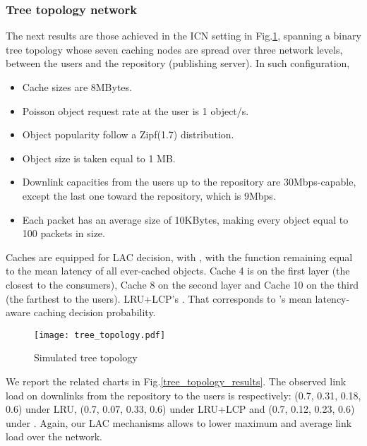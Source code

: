 \documentclass[conference]{IEEEtran}
\begin{document}
\subsubsection{Tree topology network}
The next results are those achieved in the ICN setting in Fig.\ref{fig:tree_topology}, spanning a binary tree topology whose
seven caching nodes are spread over three network levels, between the users and
the repository (publishing server). In such configuration, 
\begin{itemize}
	\item Cache sizes are 8MBytes.
	\item Poisson object request rate at the user is 1 object/s.
	\item Object popularity follow a Zipf(1.7) distribution.
	\item Object size is taken equal to 1 MB.
	\item Downlink capacities from the users up to the repository are 
	30Mbps-capable, except the last one toward the repository, which is 9Mbps.
	\item Each packet has an average size of 10KBytes, making every object equal to 100 packets in size.
\end{itemize}

Caches are equipped for LAC decision, with , with  the function  remaining equal to the mean latency of all ever-cached objects.
Cache 4 is on the first layer (the closest to the consumers), Cache 8 on the second layer and
Cache 10 on the third (the farthest to the users). 
LRU+LCP's . That corresponds to 's mean latency-aware caching decision probability. 
\begin{figure}[htbp] 
\centering
\texttt{[image: tree\_topology.pdf]}
\caption{Simulated tree topology } 
\label{fig:tree_topology} 
\end{figure}

We report the related charts in Fig.\ref{tree_topology_results}. 
The observed  link load  on downlinks from the repository to the users is respectively: (0.7, 0.31, 0.18, 0.6) under LRU, 
(0.7, 0.07, 0.33, 0.6) under LRU+LCP and (0.7, 0.12, 0.23, 0.6) under . Again, our LAC mechanisms allows to lower maximum and average link load over the network. 
\end{document}
